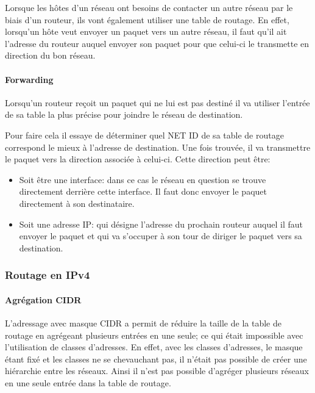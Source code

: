 Lorsque les hôtes d'un réseau ont besoins de contacter un autre réseau par le
biais d'un routeur, ils vont également utiliser une table de routage.  En
effet, lorsqu'un hôte veut envoyer un paquet vers un autre réseau, il faut
qu'il ait l'adresse du routeur auquel envoyer son paquet pour que celui-ci le
transmette en direction du bon réseau.

\paragraph{Forwarding}

Lorsqu'un routeur reçoit un paquet qui ne lui est pas destiné il va utiliser
l'entrée de sa table la plus précise pour joindre le réseau de destination.

Pour faire cela il essaye de déterminer quel NET ID de sa table de routage
correspond le mieux à l'adresse de destination.  Une fois trouvée, il va transmettre
le paquet vers la direction associée à celui-ci.
Cette direction peut être:
\begin{itemize}
\item Soit être une interface: dans ce cas le réseau en question se trouve
directement derrière cette interface. Il faut donc envoyer le paquet
directement à son destinataire.
\item Soit une adresse IP: qui désigne l'adresse du prochain routeur auquel il
faut envoyer le paquet et qui va s'occuper à son tour de diriger le paquet vers
sa destination.
\end{itemize}

\subsubsection{Routage en IPv4}
\paragraph{Agrégation CIDR}
L'adressage avec masque CIDR a permit de réduire la taille de la table de
routage en agrégeant plusieurs entrées en une seule; ce qui était impossible avec
l'utilisation de classes d'adresses.  En effet, avec les classes d'adresses, le
masque étant fixé et les classes ne se chevauchant pas, il n'était pas
possible de créer une hiérarchie entre les réseaux.  Ainsi il n'est pas
possible d'agréger plusieurs réseaux en une seule entrée dans la table de
routage.

